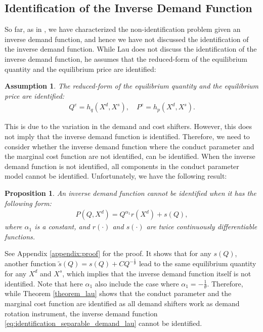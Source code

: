 \documentclass[11pt, a4paper]{article}
\newtheorem{assumption}{Assumption}
\newtheorem{proposition}{Proposition}
\theoremstyle{remark}
\begin{document}
\subsection{Identification of the Inverse Demand Function}\label{sec:identification_inverse_demand}
So far, as in \citet{lauIdentifying1982}, we have characterized the non-identification problem given an inverse demand function, and hence we have not discussed the identification of the inverse demand function.
While Lau does not discuss the identification of the inverse demand function, he assumes that the reduced-form of the equilibrium quantity and the equilibrium price are identified:
\begin{assumption}\label{assumption:reduced_form}
    The reduced-form of the equilibrium quantity and the equilibrium price are identified:
    \begin{align}
        Q^e = h_q(X^{d}, X^{s}), \quad P^e = h_p(X^{d}, X^{s}).
    \end{align}
\end{assumption}
This is due to the variation in the demand and cost shifters.
However, this does not imply that the inverse demand function is identified.
Therefore, we need to consider whether the inverse demand function where the conduct parameter and the marginal cost function are not identified, can be identified.
When the inverse demand function is not identified, all components in the conduct parameter model cannot be identified.
Unfortunately, we have the following result:
\begin{proposition}\label{proposition:nonidentification_inverse_demand_with_nonidentifed_conduct_parameter}
    An inverse demand function cannot be identified when it has the following form:
    \begin{align}
        P(Q, X^{d}) = Q^{\alpha_1}r(X^{d}) + s(Q),
    \end{align}
    where $\alpha_1$ is a constant, and $r(\cdot)$ and $s(\cdot)$ are twice continuously differentiable functions.
\end{proposition}
See Appendix \ref{appendix:proof} for the proof.
It shows that for any $s(Q)$, another function $\tilde{s}(Q) = s(Q) + C Q^{-\frac{1}{\theta}}$ lead to the same equilibrium quantity for any $X^{d}$ and $X^{s}$, which implies that the inverse demand function itself is not identified.
Note that here $\alpha_1$ also include the case where $\alpha_1 = -\frac{1}{\theta}$.
Therefore, while Theorem \ref{theorem_lau} shows that the conduct parameter and the marginal cost function are identified as all demand shifters work as demand rotation instrument, the inverse demand function \eqref{eq:identification_separable_demand_lau} cannot be identified.
\end{document}
